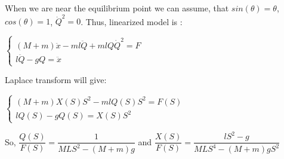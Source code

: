 \documentclass[10pt]{article}
\begin{document}
			When we are near the equilibrium point we can assume, that $sin(\theta) = \theta$, $cos(\theta) = 1$, $\dot{Q}^2 = 0$.
			Thus, linearized model is :
			
			$\begin{cases}
				(M+m) \ddot{x} - ml \ddot{Q} + ml Q \dot{Q}^2 = F\\
				l \ddot{Q} - gQ = \ddot{x}
			\end{cases}$
			
			Laplace transform will give:
			
			$\begin{cases}
				(M+m) X(S) S^2 - ml Q(S) S^2 = F(S)\\
				l Q(S) - gQ(S) = X(S) S^2
			\end{cases}$
			
			So, $\dfrac{Q(S)}{F(S)} = \dfrac{1}{MLS^2 - (M+m)g}$ and $\dfrac{X(S)}{F(S)} = \dfrac{lS^2 - g}{MLS^4 - (M+m)gS^2}$
\end{document}
